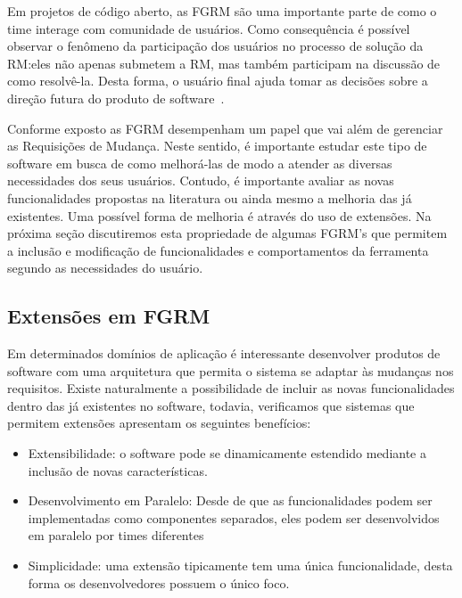 Em projetos de código aberto, as FGRM são uma importante parte de como o time
interage com comunidade de usuários. Como consequência é possível observar o
fenômeno da participação dos usuários no processo de solução da RM:\@ eles não
apenas submetem a RM, mas também participam na discussão de como resolvê-la.
Desta forma, o usuário final ajuda tomar as decisões sobre a direção futura do
produto de software~\cite{breu2010information}.

Conforme exposto as FGRM desempenham um papel que vai além de gerenciar as
Requisições de Mudança.  Neste sentido, é importante estudar este tipo de
software em busca de como melhorá-las de modo a atender as diversas necessidades
dos seus usuários. Contudo, é importante avaliar as novas funcionalidades
propostas na literatura ou ainda mesmo a melhoria das já existentes. Uma
possível forma de melhoria é através do uso de extensões. Na próxima seção
discutiremos esta propriedade de algumas FGRM's que permitem a inclusão e
modificação de funcionalidades e comportamentos da ferramenta segundo as
necessidades do usuário.

\subsection{Extensões em FGRM}
\label{subsec:extensoes_fgrm}

Em determinados domínios de aplicação é interessante desenvolver produtos de
software com uma arquitetura que permita o sistema se adaptar às mudanças nos
requisitos. Existe naturalmente a possibilidade de incluir as novas
funcionalidades dentro das já existentes no software, todavia, verificamos que
sistemas que permitem extensões apresentam os seguintes benefícios:

\begin{itemize} \item Extensibilidade: o software pode se dinamicamente
		estendido mediante a inclusão de novas características.  \item
		Desenvolvimento em Paralelo: Desde de que as funcionalidades podem ser
		implementadas como componentes separados, eles podem ser desenvolvidos
		em paralelo por times diferentes \item Simplicidade: uma  extensão
		tipicamente tem uma única funcionalidade, desta forma os desenvolvedores
		possuem o único foco.  \end{itemize}

